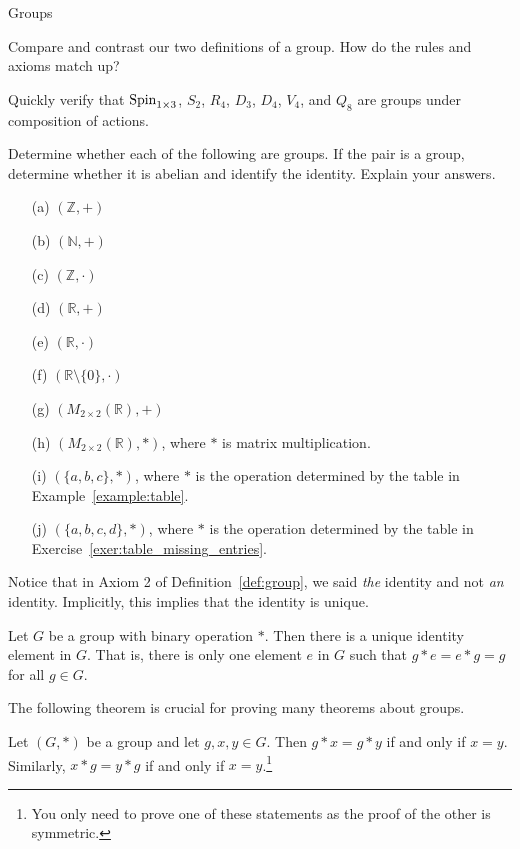 \begin{section}{Groups}
\begin{exercise}
Compare and contrast our two definitions of a group.  How do the rules and axioms match up?
\end{exercise}

\begin{exercise}
Quickly verify that $\operatorname{Spin}_{1\times 3}$, $S_2$, $R_4$, $D_3$, $D_4$, $V_4$, and $Q_8$ are groups under composition of actions.
\end{exercise}

\begin{exercise}
Determine whether each of the following are groups.  If the pair is a group, determine whether it is abelian and identify the identity.  Explain your answers.
\begin{enumerate}
\item[(a)] $(\mathbb{Z},+)$
\item[(b)] $(\mathbb{N},+)$
\item[(c)] $(\mathbb{Z},\cdot)$
\item[(d)] $(\mathbb{R},+)$
\item[(e)] $(\mathbb{R},\cdot)$
\item[(f)] $(\mathbb{R}\setminus \{0\},\cdot)$
\item[(g)] $(M_{2\times 2}(\mathbb{R}),+)$
\item[(h)] $(M_{2\times 2}(\mathbb{R}),*)$, where $*$ is matrix multiplication.
\item[(i)] $(\{a,b,c\},*)$, where $*$ is the operation determined by the table in Example~\ref{example:table}.
\item[(j)] $(\{a,b,c,d\},*)$, where $*$ is the operation determined by the table in Exercise~\ref{exer:table_missing_entries}.
\end{enumerate}
\end{exercise}

Notice that in Axiom 2 of Definition~\ref{def:group}, we said \emph{the} identity and not \emph{an} identity.  Implicitly, this implies that the identity is unique.

\begin{theorem}\label{thm:unique_id}
Let $G$ be a group with binary operation $*$.  Then there is a unique identity element in $G$.  That is, there is only one element $e$ in $G$ such that $g*e=e*g=g$ for all $g\in G$.
\end{theorem}

The following theorem is crucial for proving many theorems about groups.

\begin{theorem}
Let $(G,*)$ be a group and let $g,x,y\in G$.  Then $g*x=g*y$ if and only if $x=y$.  Similarly, $x*g=y*g$ if and only if $x=y$.\footnote{You only need to prove one of these statements as the proof of the other is symmetric.}
\end{theorem}


\end{section}
